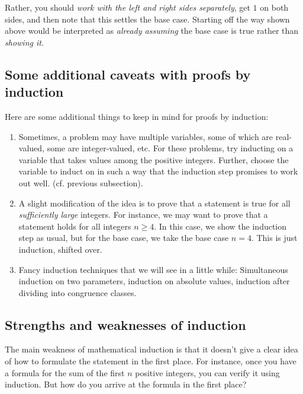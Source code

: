 \documentclass{amsart}
\begin{document}
Rather, you should {\em work with the left and right sides
separately}, get $1$ on both sides, and then note that this settles
the base case. Starting off the way shown above would be interpreted
as {\em already assuming} the base case is true rather than {\em
showing it}.

\subsection{Some additional caveats with proofs by induction}

Here are some additional things to keep in mind for proofs by induction:

\begin{enumerate}

\item Sometimes, a problem may have multiple variables, some of which
  are real-valued, some are integer-valued, etc. For these problems,
  try inducting on a variable that takes values among the positive
  integers. Further, choose the variable to induct on in such a way
  that the induction step promises to work out well. (cf. previous
  subsection).

\item A slight modification of the idea is to prove that a statement
  is true for all {\em sufficiently large} integers. For instance, we
  may want to prove that a statement holds for all integers $n \ge
  4$. In this case, we show the induction step as usual, but for the
  base case, we take the base case $n = 4$. This is just induction,
  shifted over.  

\item Fancy induction techniques that we will see in a little while:
  Simultaneous induction on two parameters, induction on absolute
  values, induction after dividing into congruence classes.

\end{enumerate}

\subsection{Strengths and weaknesses of induction}

The main weakness of mathematical induction is that it doesn't give a
clear idea of how to formulate the statement in the first place. For
instance, once you have a formula for the sum of the first $n$
positive integers, you can verify it using induction. But how do you
arrive at the formula in the first place?
\end{document}
